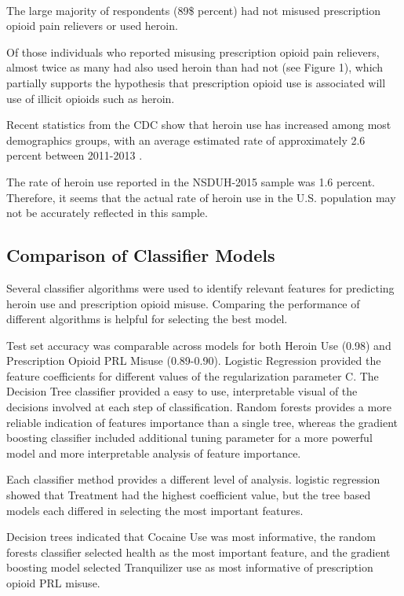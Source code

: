 \\\documentclass[sigconf]{acmart}
\begin{document}
The large majority of respondents (89\$ percent) had not misused 
prescription opioid 
pain relievers or used heroin. 

Of those individuals who reported 
misusing prescription opioid pain relievers, almost twice as many had also
used heroin than had not (see Figure 1), which partially supports the 
hypothesis that prescription opioid use is associated will use of illicit 
opioids such as heroin. 
 
 Recent statistics from the CDC show that heroin use
has increased among most demographics groups, with an average estimated rate 
of approximately 2.6 percent between 2011-2013 \cite{cdc16}.

The rate of heroin use reported in the NSDUH-2015 sample was 1.6 percent. 
Therefore, it seems that the actual rate of heroin use in the U.S. population 
may not be accurately reflected in this sample. 

 

\subsection{Comparison of Classifier Models}

Several classifier algorithms were used to identify relevant features for 
predicting heroin use and prescription opioid misuse. Comparing the performance 
of different algorithms is helpful for  selecting the best model. 

Test set
accuracy was comparable across models for both Heroin Use (0.98) and 
Prescription Opioid PRL Misuse (0.89-0.90). Logistic Regression provided the
feature coefficients for different values of the regularization parameter C. 
The Decision Tree classifier provided a easy to use, interpretable visual of
the decisions involved at each step of classification. Random forests provides
a more reliable indication of features importance than a single tree, 
whereas the gradient boosting classifier included additional tuning 
parameter for a more powerful model and more interpretable analysis of
feature importance. 

Each classifier method provides a different level of
analysis. 
logistic regression showed that Treatment had the highest coefficient value, but 
the tree based models each differed in selecting the most important features. 

Decision trees indicated that Cocaine Use was most informative, the random 
forests classifier selected health as the most important feature, and the 
gradient boosting model selected 
Tranquilizer use as most informative of prescription opioid PRL misuse. 
\end{document}
